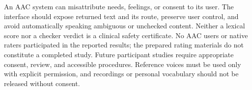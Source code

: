 An AAC system can misattribute needs, feelings, or consent to its user.
The interface should expose returned text and its route, preserve user control, and avoid automatically speaking ambiguous or unchecked content.
Neither a lexical score nor a checker verdict is a clinical safety certificate.
No AAC users or native raters participated in the reported results; the prepared rating materials do not constitute a completed study.
Future participant studies require appropriate consent, review, and accessible procedures.
Reference voices must be used only with explicit permission, and recordings or personal vocabulary should not be released without consent.
